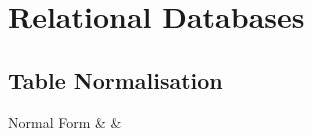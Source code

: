 \documentclass{book}
\begin{document}
	
	\section{Relational Databases}
	\subsection{Table Normalisation}
	
	\begin{tabular}
		\begin{table}[c | c | c]
			Normal Form & & 
		\end{table}
		
	\end{tabular}
		
\end{document}
